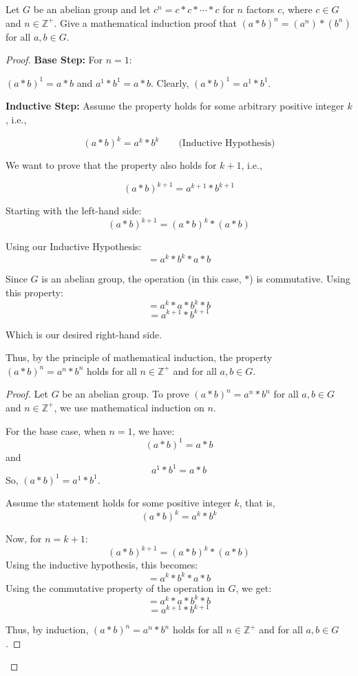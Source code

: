 \documentclass[12pt]{amsart}
\theoremstyle{definition}
\numberwithin{equation}{section}
\theoremstyle{plain}
\newcommand{\Z}{\mathbb{Z}}
\begin{document}
    \begin{exercise}{33}
        Let $G$ be an abelian group and let $c^n = c * c * \cdots * c$ for $n$ factors $c$, where $c \in G$ and $n \in \Z^+$. Give a mathematical induction proof that $(a * b)^n = (a^n) * (b^n)$ for all $a, b \in G$.
    \begin{proof}
        \textbf{Base Step:} For \( n = 1 \):
        
        \( (a * b)^1 = a * b \) and \( a^1 * b^1 = a * b \). 
        Clearly, \( (a * b)^1 = a^1 * b^1 \).
        
        \textbf{Inductive Step:} Assume the property holds for some arbitrary positive integer \( k \), i.e., 
        
        \[ (a * b)^k = a^k * b^k \quad \quad \text{(Inductive Hypothesis)} \]
        
        We want to prove that the property also holds for \( k + 1 \), i.e., 
        
        \[ (a * b)^{k+1} = a^{k+1} * b^{k+1} \]
        
        Starting with the left-hand side:
        \[ (a * b)^{k+1} = (a * b)^k * (a * b) \]
        
        Using our Inductive Hypothesis:
        \[ = a^k * b^k * a * b \]
        
        Since \( G \) is an abelian group, the operation (in this case, \( * \)) is commutative. Using this property:
        \[ = a^k * a * b^k * b \]
        \[ = a^{k+1} * b^{k+1} \]
        
        Which is our desired right-hand side.
        
        Thus, by the principle of mathematical induction, the property \( (a * b)^n = a^n * b^n \) holds for all \( n \in \Z^+ \) and for all \( a, b \in G \).
        
        \begin{proof}
        Let \( G \) be an abelian group. To prove \( (a * b)^n = a^n * b^n \) for all \( a, b \in G \) and \( n \in \Z^+ \), we use mathematical induction on \( n \).
        
        For the base case, when \( n = 1 \), we have:
        \[ (a * b)^1 = a * b \]
        and 
        \[ a^1 * b^1 = a * b \]
        So, \( (a * b)^1 = a^1 * b^1 \).
        
        Assume the statement holds for some positive integer \( k \), that is,
        \[ (a * b)^k = a^k * b^k \]
        
        Now, for \( n = k + 1 \):
        \[ (a * b)^{k+1} = (a * b)^k * (a * b) \]
        Using the inductive hypothesis, this becomes:
        \[ = a^k * b^k * a * b \]
        Using the commutative property of the operation in \( G \), we get:
        \[ = a^k * a * b^k * b \]
        \[ = a^{k+1} * b^{k+1} \]
        
        Thus, by induction, \( (a * b)^n = a^n * b^n \) holds for all \( n \in \Z^+ \) and for all \( a, b \in G \).
        \end{proof}
    \end{proof}
    \end{exercise}
    
\end{document}
